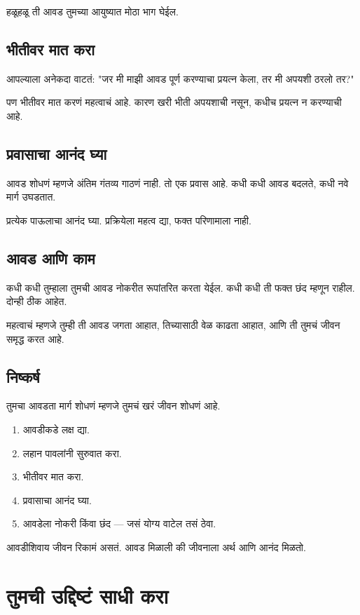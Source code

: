 हळूहळू ती आवड तुमच्या आयुष्यात मोठा भाग घेईल.  

\section*{भीतीवर मात करा}
आपल्याला अनेकदा वाटतं:  
"जर मी माझी आवड पूर्ण करण्याचा प्रयत्न केला,  
तर मी अपयशी ठरलो तर?"  

पण भीतीवर मात करणं महत्वाचं आहे.  
कारण खरी भीती अपयशाची नसून,  
कधीच प्रयत्न न करण्याची आहे.  

\section*{प्रवासाचा आनंद घ्या}
आवड शोधणं म्हणजे अंतिम गंतव्य गाठणं नाही.  
तो एक प्रवास आहे.  
कधी कधी आवड बदलते,  
कधी नवे मार्ग उघडतात.  

प्रत्येक पाऊलाचा आनंद घ्या.  
प्रक्रियेला महत्व द्या,  
फक्त परिणामाला नाही.  

\section*{आवड आणि काम}
कधी कधी तुम्हाला तुमची आवड नोकरीत रूपांतरित करता येईल.  
कधी कधी ती फक्त छंद म्हणून राहील.  
दोन्ही ठीक आहेत.  

महत्वाचं म्हणजे तुम्ही ती आवड जगता आहात,  
तिच्यासाठी वेळ काढता आहात,  
आणि ती तुमचं जीवन समृद्ध करत आहे.  

\section*{निष्कर्ष}
तुमचा आवडता मार्ग शोधणं म्हणजे  
तुमचं खरं जीवन शोधणं आहे.  

\begin{enumerate}
\item आवडीकडे लक्ष द्या.  
\item लहान पावलांनी सुरुवात करा.  
\item भीतीवर मात करा.  
\item प्रवासाचा आनंद घ्या.  
\item आवडेला नोकरी किंवा छंद — जसं योग्य वाटेल तसं ठेवा.  
\end{enumerate}

आवडीशिवाय जीवन रिकामं असतं.  
आवड मिळाली की जीवनाला अर्थ आणि आनंद मिळतो.  


\chapter{तुमची उद्दिष्टं साधी करा}

